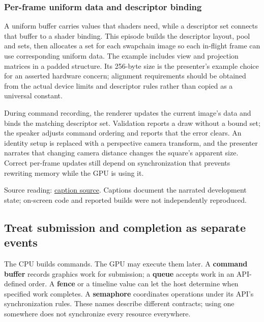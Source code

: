 \subsubsection{Per-frame uniform data and descriptor binding}\label{06-engine-ii-ch026-per-frame-uniform-data-and-descriptor-binding}

\hypertarget{06-engine-ii-ch026-per-frame-uniform-data-and-descriptor-binding}{}

A uniform buffer carries values that shaders need, while a descriptor set connects that buffer to a shader binding. This episode builds the descriptor layout, pool and sets, then allocates a set for each swapchain image so each in-flight frame can use corresponding uniform data. The example includes view and projection matrices in a padded structure. Its 256-byte size is the presenter's example choice for an asserted hardware concern; alignment requirements should be obtained from the actual device limits and descriptor rules rather than copied as a universal constant.

During command recording, the renderer updates the current image's data and binds the matching descriptor set. Validation reports a draw without a bound set; the speaker adjusts command ordering and reports that the error clears. An identity setup is replaced with a perspective camera transform, and the presenter narrates that changing camera distance changes the square's apparent size. Correct per-frame updates still depend on synchronization that prevents rewriting memory while the GPU is using it.

Source reading: \href{https://www.youtube.com/watch?v=yc40ixalLtU}{caption source}. Captions document the narrated development state; on-screen code and reported builds were not independently reproduced.

\subsection{Treat submission and completion as separate events}\label{06-engine-ii-ch026-treat-submission-and-completion-as-separate-events}

\hypertarget{06-engine-ii-ch026-treat-submission-and-completion-as-separate-events}{}

The CPU builds commands. The GPU may execute them later. A \textbf{command buffer} records graphics work for submission; a \textbf{queue} accepts work in an API-defined order. A \textbf{fence} or a timeline value can let the host determine when specified work completes. A \textbf{semaphore} coordinates operations under its API's synchronization rules. These names describe different contracts; using one somewhere does not synchronize every resource everywhere.

